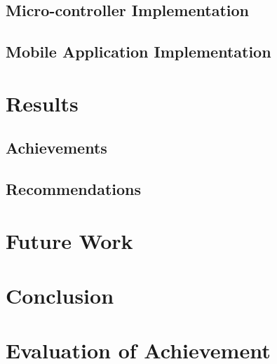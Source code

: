 \documentclass{article}
\begin{document}
		\subsection{Micro-controller Implementation}
			\lipsum[1]
			
		\subsection{Mobile Application Implementation}
			\lipsum[1]
			
	\section{Results}
		\subsection{Achievements}
			\lipsum[1]
			
		\subsection{Recommendations}
			\lipsum[1]
			
	\section{Future Work}
		\lipsum[1]
	
	\section{Conclusion}
		\lipsum[1]
		
	\section{Evaluation of Achievement}
		\lipsum[1]
		
	
	
	

	\newpage
\end{document}
